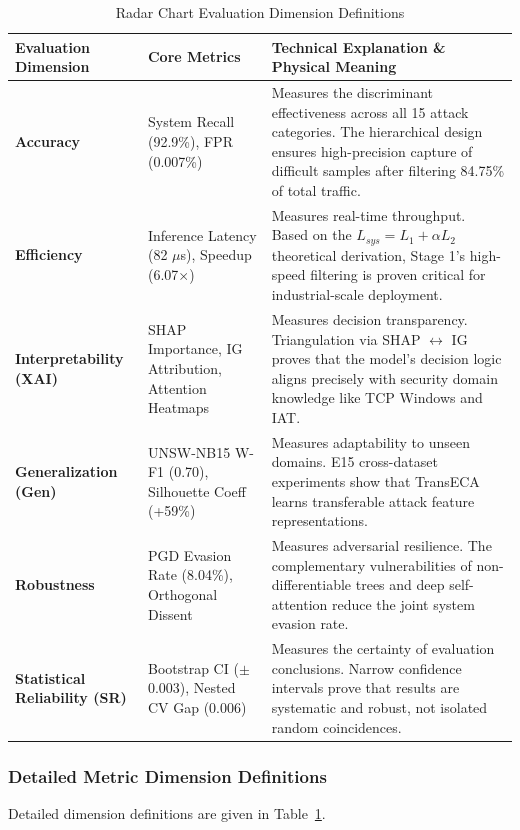 \documentclass[sigconf]{acmart}
\begin{document}
\begin{table}[!t]
\caption{Radar Chart Evaluation Dimension Definitions}
\label{tab:radar_dimensions}
\begin{tabular}{p{3.0cm}p{5.4cm}p{7.9cm}}
\toprule
\textbf{Evaluation Dimension} & \textbf{Core Metrics} & \textbf{Technical Explanation \& Physical Meaning} \\
\midrule
\textbf{Accuracy} & System Recall (92.9\%), FPR (0.007\%) & Measures the discriminant effectiveness across all 15 attack categories. The hierarchical design ensures high-precision capture of difficult samples after filtering 84.75\% of total traffic. \\
\textbf{Efficiency} & Inference Latency (82 $\mu$s), Speedup (6.07$\times$) & Measures real-time throughput. Based on the $L_{sys} = L_1 + \alpha L_2$ theoretical derivation, Stage 1's high-speed filtering is proven critical for industrial-scale deployment. \\
\textbf{Interpretability (XAI)} & SHAP Importance, IG Attribution, Attention Heatmaps & Measures decision transparency. Triangulation via SHAP $\leftrightarrow$ IG proves that the model's decision logic aligns precisely with security domain knowledge like TCP Windows and IAT. \\
\textbf{Generalization (Gen)} & UNSW-NB15 W-F1 (0.70), Silhouette Coeff (+59\%) & Measures adaptability to unseen domains. E15 cross-dataset experiments show that TransECA learns transferable attack feature representations. \\
\textbf{Robustness} & PGD Evasion Rate (8.04\%), Orthogonal Dissent & Measures adversarial resilience. The complementary vulnerabilities of non-differentiable trees and deep self-attention reduce the joint system evasion rate. \\
\textbf{Statistical Reliability (SR)} & Bootstrap CI ($\pm$0.003), Nested CV Gap (0.006) & Measures the certainty of evaluation conclusions. Narrow confidence intervals prove that results are systematic and robust, not isolated random coincidences. \\
\bottomrule
\end{tabular}
\end{table}

\subsubsection{Detailed Metric Dimension Definitions} Detailed dimension definitions are given in Table~\ref{tab:radar_dimensions}.
\end{document}
